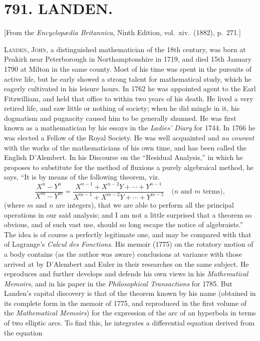 \documentclass[11pt,a4paper]{article}
\theoremstyle{definition}
\begin{document}
\section*{791. LANDEN.}

\begin{flushright}
\small[From the \textit{Encyclop{\ae}dia Britannica}, Ninth Edition, vol.~xiv.~(1882), p.~271.]
\end{flushright}

\textsc{Landen, John}, a distinguished mathematician of the 18th century, was born at Peakirk near Peterborough in Northamptonshire in 1719, and died 15th January 1790 at Milton in the same county. Most of his time was spent in the pursuits of active life, but he early showed a strong talent for mathematical study, which he eagerly cultivated in his leisure hours. In 1762 he was appointed agent to the Earl Fitzwilliam, and held that office to within two years of his death. He lived a very retired life, and saw little or nothing of society; when he did mingle in it, his dogmatism and pugnacity caused him to be generally shunned. He was first known as a mathematician by his essays in the \textit{Ladies' Diary} for 1744. In 1766 he was elected a Fellow of the Royal Society. He was well acquainted and \textit{au courant} with the works of the mathematicians of his own time, and has been called the English D'Alembert. In his Discourse on the ``Residual Analysis,'' in which he proposes to substitute for the method of fluxions a purely algebraical method, he says, ``It is by means of the following theorem, viz.
\[
\frac{X^n-Y^n}{X^m-Y^m}=\frac{X^{n-1}+X^{n-2}Y+\cdots+Y^{n-1}}{X^{m-1}+X^{m-2}Y+\cdots+Y^{m-1}}\quad\text{($n$ and $m$ terms)},
\]
(where $m$ and $n$ are integers), that we are able to perform all the principal operations in our said analysis; and I am not a little surprised that a theorem so obvious, and of such vast use, should so long escape the notice of algebraists.'' The idea is of course a perfectly legitimate one, and may be compared with that of Lagrange's \textit{Calcul des Fonctions}. His memoir (1775) on the rotatory motion of a body contains (as the author was aware) conclusions at variance with those arrived at by D'Alembert and Euler in their researches on the same subject. He reproduces and further develops and defends his own views in his \textit{Mathematical Memoirs}, and in his paper in the \textit{Philosophical Transactions} for 1785. But Landen's capital discovery is that of the theorem known by his name (obtained in its complete form in the memoir of 1775, and reproduced in the first volume of the \textit{Mathematical Memoirs}) for the expression of the arc of an hyperbola in terms of two elliptic arcs. To find this, he integrates a differential equation derived from the equation
\end{document}
